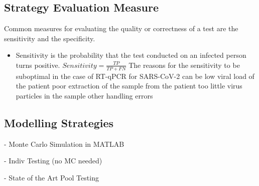 \documentclass[fleqn,10pt]{wlscirep}
\begin{document}
\subsection{Strategy Evaluation Measure}
Common measures for evaluating the quality or correctness of a test are the sensitivity and the specificity.
\begin{itemize}
	\item Sensitivity is the probability that the test conducted on an infected person turns positive. $Sensitivity = \frac{TP}{TP+FN}$ The reasons for the sensitivity to be suboptimal in the case of RT-qPCR for SARS-CoV-2 can be
	\subitem low viral load of the patient
	\subitem poor extraction of the sample from the patient
	\subitem too little virus particles in the sample
	\subitem other handling errors
\end{itemize}

\subsection{Modelling Strategies}
- Monte Carlo Simulation in MATLAB 

- Indiv Testing (no MC needed)

- State of the Art Pool Testing
\end{document}
